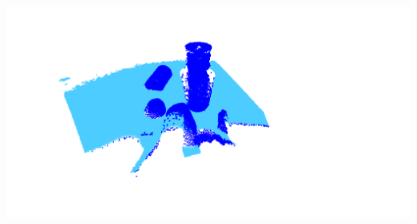 \documentclass[12pt]{article}
\begin{document}
	\includegraphics[width=\linewidth]{Figure_5}
\end{document}
